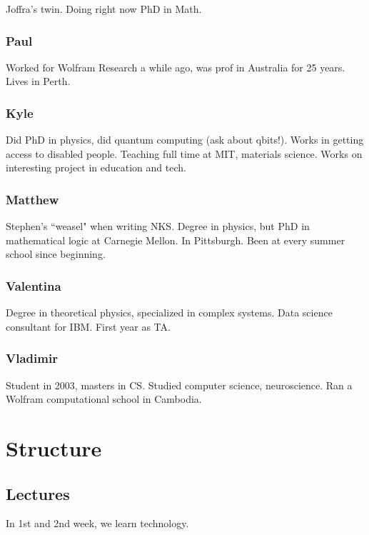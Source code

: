 \documentclass[11pt]{article}
\theoremstyle{definition}
\begin{document}
Joffra's twin. Doing right now PhD in Math.

\subsubsection{Paul}

Worked for Wolfram Research a while ago, was prof in Australia for 25 years. Lives in Perth.

\subsubsection{Kyle}

Did PhD in physics, did quantum computing (ask about qbits!). Works in getting access to disabled people. Teaching full time at MIT, materials science. Works on interesting project in education and tech. 

\subsubsection{Matthew}

Stephen's ``weasel" when writing NKS. Degree in physics, but PhD in mathematical logic at Carnegie Mellon. In Pittsburgh. Been at every summer school since beginning. 

\subsubsection{Valentina}

Degree in theoretical physics, specialized in complex systems. Data science consultant for IBM. First year as TA. 

\subsubsection{Vladimir}

Student in 2003, masters in CS. Studied computer science, neuroscience. Ran a Wolfram computational school in Cambodia.

\section{Structure}

\subsection{Lectures}

In 1st and 2nd week, we learn technology. 
\end{document}

